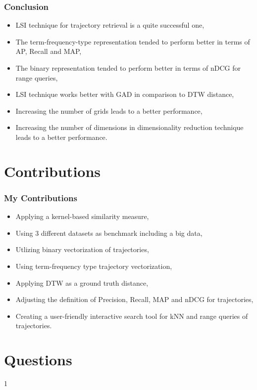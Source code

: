 \documentclass{beamer}
\begin{document}
\begin{frame}
\frametitle{Conclusion} 
\begin{block}{}
\begin{itemize}
\item LSI technique for trajectory retrieval is a quite {\color{orange} successful} one, \pause
\item The {\color{orange} term-frequency-type} representation tended to perform better in terms of {\color{orange} AP, Recall and MAP}, \pause
\item The {\color{orange} binary} representation tended to perform better in terms of {\color{orange} nDCG} for range queries, \pause
\item LSI technique works better with GAD in comparison to DTW distance, \pause
\item Increasing the number of grids leads to a better performance, \pause
\item Increasing the number of dimensions in dimensionality reduction technique leads to a better performance.
\end{itemize}
\end{block}
\end{frame}





\section{Contributions}

\begin{frame}
\frametitle{My Contributions} 
\begin{block}{}
\begin{itemize}
\item Applying a {\color{orange} kernel-based} similarity measure, \vspace{1mm}
\item Using {\color{orange} 3} different datasets as benchmark including a big data, \vspace{1mm}
\item Utlizing {\color{orange} binary} vectorization of trajectories, \vspace{1mm}
\item Using {\color{orange} term-frequency} type trajectory vectorization, \vspace{1mm}
\item Applying {\color{orange} DTW} as a ground truth distance, \vspace{1mm}
\item Adjusting the definition of {\color{orange} Precision, Recall, MAP and nDCG} for trajectories, \vspace{1mm}
\item Creating a {\color{orange} user-friendly interactive search tool} for kNN and range queries of trajectories. 
\end{itemize}

\end{block}
\end{frame}




\section*{Questions}
{\color{white}1}
\begin{center} 
{\huge {}}
\end{center}
\end{document}
